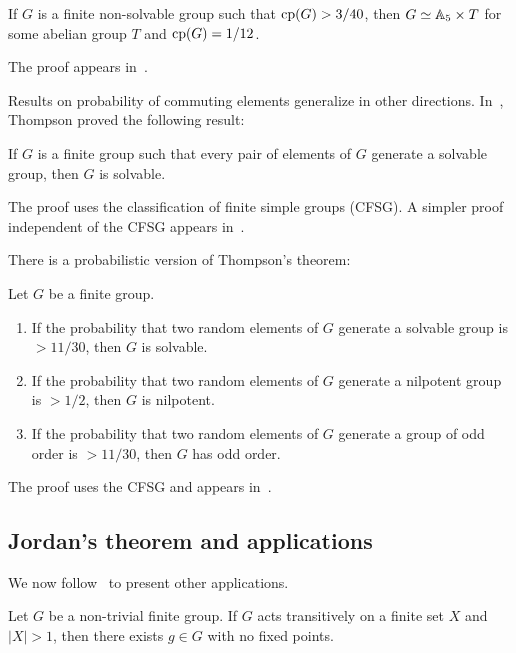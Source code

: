 \begin{theorem}
    If $G$ is a finite non-solvable group such that $\operatorname{cp}(G)>3/40$, then
    $G\simeq\mathbb{A}_5\times T$ for some abelian group 
    $T$ and $\operatorname{cp}(G)=1/12$. 
\end{theorem}

The proof appears in~\cite{MR2228209}.

Results on probability of commuting elements generalize in other directions. 
In~\cite{MR230809,MR276325,MR313378,MR369512}, 
Thompson proved the following result:

\begin{theorem}[Thompson]
    If $G$ is a finite group such that 
    every pair of elements of $G$ generate
    a solvable group, then $G$ is solvable. 
\end{theorem}

The proof uses the classification of finite simple groups (CFSG). A simpler
proof independent of the CFSG appears in~\cite{MR1346207}.

There is a probabilistic version of Thompson's theorem:

\begin{theorem}
    Let $G$ be a finite group.
    \begin{enumerate}
        \item If the probability that two random elements of $G$ 
        generate a solvable group is $>11/30$, then $G$ is solvable. 
        \item If the probability that two random elements of $G$ 
        generate a nilpotent group is $>1/2$, then $G$ is nilpotent.
        \item If the probability that two random elements of $G$ 
        generate a group of odd order is $>11/30$, then $G$ has odd order.
    \end{enumerate}
\end{theorem}

The proof uses the CFSG and appears in~\cite{MR1770615}.

\subsection{Jordan's theorem and applications}

We now follow~\cite{MR1997347} to present other applications. 

\begin{theorem}[Jordan]
    Let $G$ be a non-trivial finite group. If $G$ acts transitively 
    on a finite set $X$ and $|X|>1$, then there exists 
    $g\in G$ with no fixed points.
\end{theorem}

